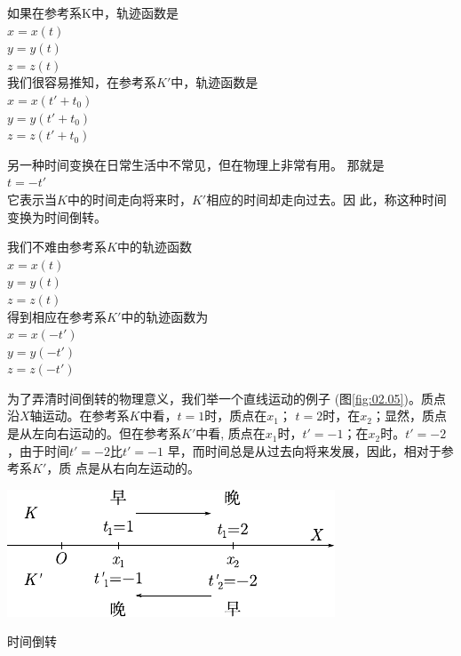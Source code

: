 如果在参考系K中，轨迹函数是\vspace{-0.2em}
\\\null\qquad\qquad\qquad$x=x(t)$
\\\null\qquad\qquad\qquad$y=y(t)$
\\\null\qquad\qquad\qquad$z=z(t)$\\
我们很容易推知，在参考系$K'$中，轨迹函数是\vspace{-0.2em}
\\\null\qquad\qquad\qquad$x=x(t'+t_0)$
\\\null\qquad\qquad\qquad$y=y(t'+t_0)$
\\\null\qquad\qquad\qquad$z=z(t'+t_0)$

另一种时间变换在日常生活中不常见，但在物理上非常有用。
那就是\vspace{-0.5em}
\\\null\qquad\qquad\qquad$t=-t'$\\
它表示当$K$中的时间走向将来时，$K'$相应的时间却走向过去。因
此，称这种时间变换为时间倒转。

我们不难由参考系$K$中的轨迹函数\vspace{-0.2em}
\\\null\qquad\qquad\qquad$x=x(t)$
\\\null\qquad\qquad\qquad$y=y(t)$
\\\null\qquad\qquad\qquad$z=z(t)$\\
得到相应在参考系$K'$中的轨迹函数为\vspace{-0.2em}
\\\null\qquad\qquad\qquad$x=x(-t')$
\\\null\qquad\qquad\qquad$y=y(-t')$
\\\null\qquad\qquad\qquad$z=z(-t')$

为了弄清时间倒转的物理意义，我们举一个直线运动的例子
(图\ref{fig:02.05})。质点沿$X$轴运动。在参考系$K$中看，$t=1$时，质点在$x_1$；
$t=2$时，在$x_2$；显然，质点是从左向右运动的。但在参考系$K'$中看,
质点在$x_1$时，$t'=-1$；在$x_2$时。$t'=-2$，由于时间$t'=-2$比$t'=-1$
早，而时间总是从过去向将来发展，因此，相对于参考系$K'$，质
点是从右向左运动的。
\begin{figurex}
    \centering
    \includegraphics{figure/fig02.05}
    \caption{时间倒转}
    \label{fig:02.05}
\end{figurex}
